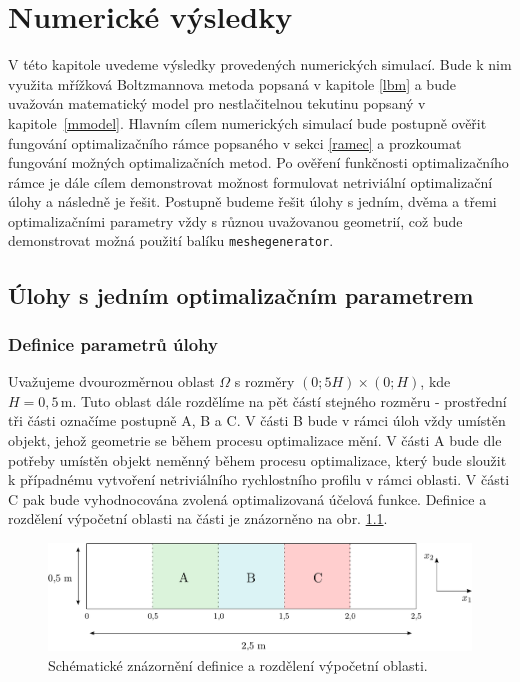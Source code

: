 \chapter{Numerické výsledky}\label{vysledky}
V této kapitole uvedeme výsledky  provedených numerických simulací. Bude k nim využita mřížková Boltzmannova metoda popsaná v kapitole \ref{lbm} a bude uvažován matematický model pro nestlačitelnou tekutinu popsaný v kapitole~\ref{mmodel}. Hlavním cílem numerických simulací bude postupně ověřit fungování optimalizačního rámce popsaného v sekci \ref{ramec} a prozkoumat fungování možných optimalizačních metod. Po ověření funkčnosti optimalizačního rámce je dále cílem demonstrovat možnost formulovat netriviální optimalizační úlohy a následně je řešit. Postupně budeme řešit úlohy s jedním, dvěma a třemi optimalizačními parametry vždy s různou uvažovanou geometrií, což bude demonstrovat možná použití balíku \texttt{meshegenerator}.


\section{Úlohy s jedním optimalizačním parametrem}
\subsection{Definice parametrů úlohy}
Uvažujeme dvourozměrnou oblast $ \Omega $ s rozměry $ \left(0; 5H\right) \times \left(0; H\right)$, kde $ H = 0{,}5 \, \mathrm{m} $. Tuto oblast dále rozdělíme na pět částí stejného rozměru - prostřední tři části označíme postupně A, B a C. V části B bude v rámci úloh vždy umístěn objekt, jehož geometrie se během procesu optimalizace mění. V části A bude dle potřeby umístěn objekt neměnný během procesu optimalizace, který bude sloužit k případnému vytvoření netriviálního rychlostního profilu v rámci oblasti. V části C pak bude vyhodnocována zvolená optimalizovaná účelová funkce. Definice a rozdělení výpočetní oblasti na části je znázorněno na obr. \ref{fig:oblast uloha 1}.
\begin{figure}[H]
	\vspace{2mm}
	\centering
	\includegraphics[width=1.0\textwidth]{Images/oblast12.pdf}
	\caption{Schématické znázornění definice a rozdělení výpočetní oblasti.}
	\label{fig:oblast uloha 1}
\end{figure}


